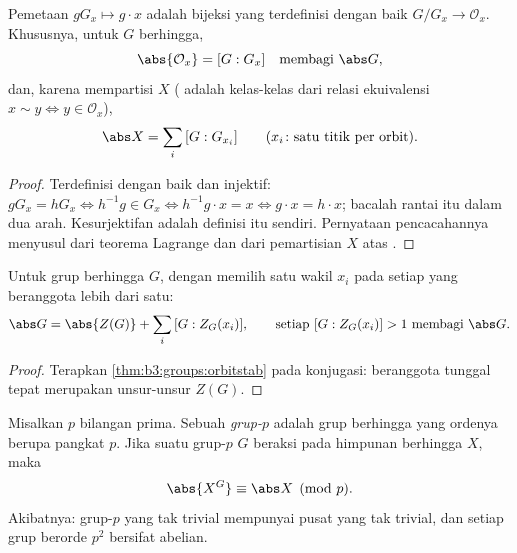 \begin{theorem}\label{thm:b3:groups:orbitstab}
Pemetaan $gG_x \mapsto g \cdot x$ adalah bijeksi yang terdefinisi dengan baik
$G/G_x \to \mathcal O_x$. Khususnya, untuk $G$
berhingga,
\[
\abs{\mathcal O_x} = [G : G_x] \quad\text{membagi } \abs G,
\]
dan, karena  mempartisi $X$ ( adalah kelas-kelas dari
relasi ekuivalensi $x \sim y \iff y \in \mathcal O_x$),
\[
\abs X = \sum_{i} \,[G : G_{x_i}]
\qquad (x_i\colon \text{satu titik per orbit}).
\]
\end{theorem}

\begin{proof}
Terdefinisi dengan baik dan injektif: $gG_x = hG_x \iff h^{-1}g \in G_x \iff
h^{-1}g \cdot x = x \iff g \cdot x = h \cdot x$; bacalah rantai itu
dalam dua arah. Kesurjektifan adalah definisi  itu sendiri. Pernyataan
pencacahannya menyusul dari teorema Lagrange dan dari pemartisian
$X$ atas .
\end{proof}

\begin{corollary}\label{cor:b3:groups:classeq}
Untuk grup berhingga $G$, dengan memilih satu wakil $x_i$ pada setiap
 yang beranggota lebih dari satu:
\[
\abs G = \abs{Z(G)} + \sum_i \,[G : Z_G(x_i)],
\qquad\text{setiap } [G : Z_G(x_i)] > 1 \text{ membagi } \abs G.
\]
\end{corollary}

\begin{proof}
Terapkan \cref{thm:b3:groups:orbitstab} pada  konjugasi:
 beranggota tunggal tepat merupakan unsur-unsur $Z(G)$.
\end{proof}

\begin{theorem}\label{thm:b3:groups:pfixed}
Misalkan $p$ bilangan prima. Sebuah \emph{grup-$p$} adalah
grup berhingga yang ordenya berupa pangkat $p$. Jika suatu grup-$p$ $G$ beraksi
pada himpunan berhingga $X$, maka
\[
\abs{X^G} \equiv \abs X \pmod p .
\]
Akibatnya: grup-$p$ yang tak trivial mempunyai pusat yang tak trivial, dan
setiap grup berorde $p^2$ bersifat abelian.
\end{theorem}

